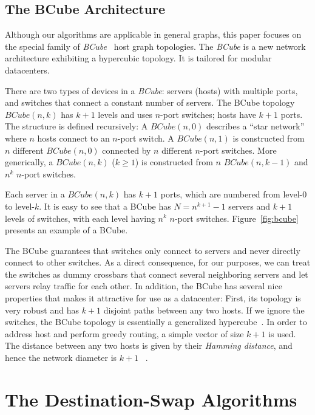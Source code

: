 \documentclass[conference]{IEEEtran}
\def\BC#1#2{BCube(#1,#2)}
\begin{document}
\subsection{The BCube Architecture}
\label{sec:Bcube}

Although our algorithms are applicable in general graphs, this paper focuses on the special family of \emph{BCube}~\cite{bcube2009} host graph topologies.
The \emph{BCube} is a new network architecture exhibiting a hypercubic topology. It is tailored for modular datacenters.

There are two types of devices in a \emph{BCube}: servers (hosts) with multiple ports, and switches that connect a constant number of servers.
The BCube topology $\BC{n}{k}$ has $k+1$ levels and uses $n$-port switches; hosts have $k+1$ ports.
The structure is defined recursively:
A  $\BC{n}{0}$ describes a ``star network'' where $n$ hosts connect to an $n$-port switch.
A $\BC{n}{1}$ is constructed from $n$ different $\BC{n}{0}$ connected by $n$ different $n$-port
switches. More generically, a $\BC{n}{k}$ ($k \ge1$) is constructed from $n$ $\BC{n}{k-1}$ and $n^k$ $n$-port switches.

Each server in a  $\BC{n}{k}$ has $k + 1$ ports, which are numbered from level-0 to level-$k$. It is easy to see that a BCube has
$N = n^{k+1}-1$ servers and $k+1$ levels of switches, with each level
having $n^k$ $n$-port switches. Figure~\ref{fig:bcube} presents an example of a BCube.



The BCube guarantees that switches only connect to servers and never directly connect to other switches.
As a direct consequence, for our purposes, we can treat the switches as dummy crossbars that connect several neighboring servers and let servers relay traffic for each other. In addition, the BCube has several nice properties that makes it attractive for use as a datacenter: First, its topology is very robust and has
$k+1$ disjoint paths between any two hosts. If we ignore the switches, the BCube topology is essentially a generalized
hypercube~\cite{generalizedHyper}. In order to address host and perform greedy routing, a  simple vector of size $k+1$ is used. The distance between any two hosts is
given by their \emph{Hamming distance}, and hence the network diameter is $k+1$ ~\cite{bcube2009}.





\section{The Destination-Swap Algorithms}\label{sec:algoanal}
\end{document}
